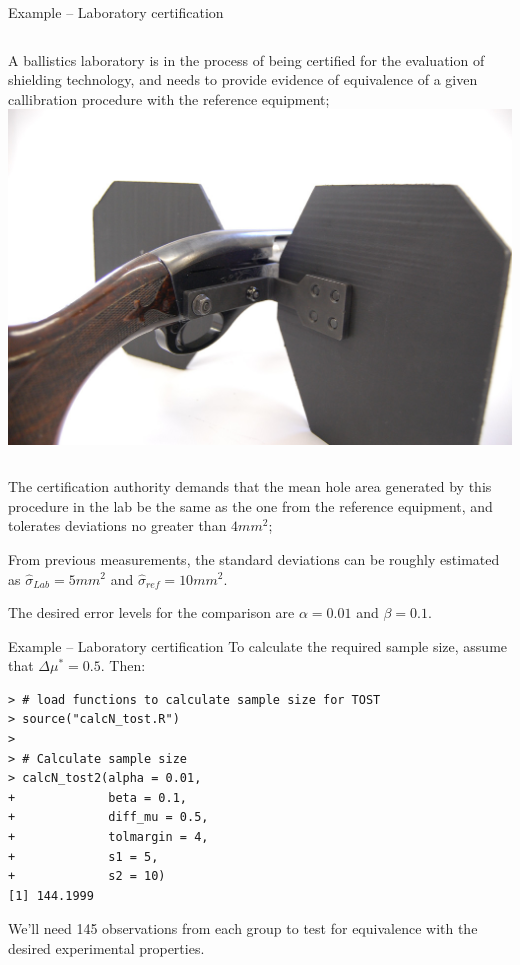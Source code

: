 \begin{frame}{Example -- Laboratory certification}

\begin{columns}[T]
  A ballistics laboratory is in the process of being certified for the evaluation of shielding technology, and needs to provide evidence of equivalence of a given callibration procedure with the reference equipment;
  \includegraphics[width=\textwidth]{../img/Shotgun-Ballistic-Shield.png}
\end{columns}
\bigskip

The certification authority demands that the mean hole area generated by this procedure in the lab be the same as the one from the reference equipment, and tolerates deviations no greater than $4 mm^2$;
\bigskip

From previous measurements, the standard deviations can be roughly estimated as $\hat{\sigma}_{Lab} = 5 mm^2$ and $\hat{\sigma}_{ref} = 10 mm^2$.
\bigskip

The desired error levels for the comparison are $\alpha=0.01$ and $\beta = 0.1$.
\end{frame}

\begin{frame}[fragile]{Example -- Laboratory certification}
To calculate the required sample size, assume that $\Delta\mu^* = 0.5$. Then:
\begin{verbatim}
> # load functions to calculate sample size for TOST
> source("calcN_tost.R")
>
> # Calculate sample size
> calcN_tost2(alpha = 0.01,
+             beta = 0.1,
+             diff_mu = 0.5,
+             tolmargin = 4,
+             s1 = 5,
+             s2 = 10)
[1] 144.1999
\end{verbatim}
\medskip
We'll need 145 observations from each group to test for equivalence with the desired experimental properties.
\end{frame}

